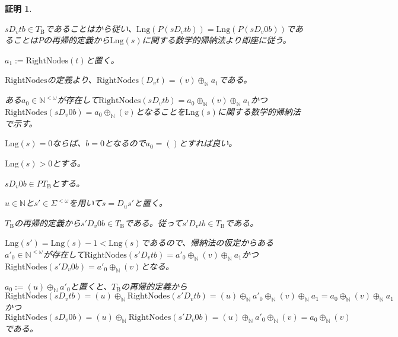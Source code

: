 \documentclass[dvipdfmx,uplatex]{jsarticle}
\theoremstyle{customnonumberbreakfortheorem}
\theoremstyle{customnonumberbreakforproof}
\newtheorem{hideableproof}{証明}
\begin{document}
\begin{hideableproof}
	\begin{indented}
		\item \(s D_v t b \in T_{\textrm{B}}\)であることはから従い、\(\textrm{Lng}(P(s D_v t b)) = \textrm{Lng}(P(s D_v 0 b))\)であることは\(P\)の再帰的定義から\(\textrm{Lng}(s)\)に関する数学的帰納法より即座に従う。
		\item \(a_1 := \textrm{RightNodes}(t)\)と置く。
		\item \(\textrm{RightNodes}\)の定義より、\(\textrm{RightNodes}(D_v t) = (v) \oplus_{\mathbb{N}} a_1\)である。
		\item ある\(a_0 \in \mathbb{N}^{< \omega}\)が存在して\(\textrm{RightNodes}(s D_v t b) = a_0 \oplus_{\mathbb{N}} (v) \oplus_{\mathbb{N}} a_1\)かつ\(\textrm{RightNodes}(s D_v 0 b) = a_0 \oplus_{\mathbb{N}} (v)\)となることを\(\textrm{Lng}(s)\)に関する数学的帰納法で示す。
		\item \(\textrm{Lng}(s) = 0\)ならば、\(b = 0\)となるので\(a_0 = ()\)とすれば良い。
		\item \(\textrm{Lng}(s) > 0\)とする。
		\begin{indented}
			\item \(s D_v 0 b \in PT_{\textrm{B}}\)とする。
			\begin{indented}
				\item \(u \in \mathbb{N}\)と\(s' \in \Sigma^{< \omega}\)を用いて\(s = D_u s'\)と置く。
				\item \(T_{\textrm{B}}\)の再帰的定義から\(s' D_v 0 b \in T_{\textrm{B}}\)である。従って\(s' D_v t b \in T_{\textrm{B}}\)である。
				\item \(\textrm{Lng}(s') = \textrm{Lng}(s)-1 < \textrm{Lng}(s)\)であるので、帰納法の仮定からある\(a'_0 \in \mathbb{N}^{< \omega}\)が存在して\(\textrm{RightNodes}(s' D_v t b) = a'_0 \oplus_{\mathbb{N}} (v) \oplus_{\mathbb{N}} a_1\)かつ\(\textrm{RightNodes}(s' D_v 0 b) = a'_0 \oplus_{\mathbb{N}} (v)\)となる。
				\item \(a_0 := (u) \oplus_{\mathbb{N}} a'_0\)と置くと、\(T_{\textrm{B}}\)の再帰的定義から\(\textrm{RightNodes}(s D_v t b) = (u) \oplus_{\mathbb{N}} \textrm{RightNodes}(s' D_v t b) = (u) \oplus_{\mathbb{N}} a'_0 \oplus_{\mathbb{N}} (v) \oplus_{\mathbb{N}} a_1 = a_0 \oplus_{\mathbb{N}} (v) \oplus_{\mathbb{N}} a_1\)かつ\(\textrm{RightNodes}(s D_v 0 b) = (u) \oplus_{\mathbb{N}} \textrm{RightNodes}(s' D_v 0 b) = (u) \oplus_{\mathbb{N}} a'_0 \oplus_{\mathbb{N}} (v) = a_0 \oplus_{\mathbb{N}} (v)\)である。
			\end{indented}

\end{indented}
\end{indented}
\end{hideableproof}
\end{document}
